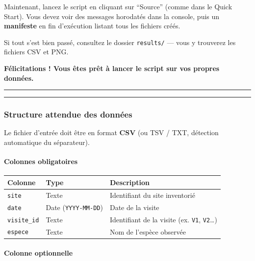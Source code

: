 Maintenant, lancez le script en cliquant sur ``Source'' (comme dans le
Quick Start). Vous devez voir des messages horodatés dans la console,
puis un \textbf{manifeste} en fin d'exécution listant tous les fichiers
créés.

Si tout s'est bien passé, consultez le dossier \texttt{results/} ---
vous y trouverez les fichiers CSV et PNG.

\textbf{Félicitations ! Vous êtes prêt à lancer le script sur vos
propres données.}

\begin{center}\rule{0.5\linewidth}{0.5pt}\end{center}

\begin{center}\rule{0.5\linewidth}{0.5pt}\end{center}

\subsubsection{Structure attendue des
données}\label{structure-attendue-des-donnuxe9es}

Le fichier d'entrée doit être en format \textbf{CSV} (ou TSV / TXT,
détection automatique du séparateur).

\paragraph{Colonnes obligatoires}\label{colonnes-obligatoires}

{\def\LTcaptype{none} %
\begin{longtable}[]{@{}lll@{}}
\toprule\noalign{}
Colonne & Type & Description \\
\midrule\noalign{}
\endhead
\bottomrule\noalign{}
\endlastfoot
\texttt{site} & Texte & Identifiant du site inventorié \\
\texttt{date} & Date (\texttt{YYYY-MM-DD}) & Date de la visite \\
\texttt{visite\_id} & Texte & Identifiant de la visite (ex. \texttt{V1},
\texttt{V2}\ldots) \\
\texttt{espece} & Texte & Nom de l'espèce observée \\
\end{longtable}
}

\paragraph{Colonne optionnelle}\label{colonne-optionnelle}

